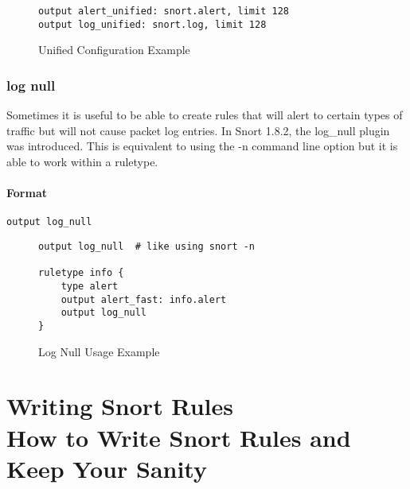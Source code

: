 \documentclass[english]{report}
\begin{document}
\begin{figure}[!hbpt]
\begin{verbatim}
output alert_unified: snort.alert, limit 128
output log_unified: snort.log, limit 128
\end{verbatim}
\caption{Unified Configuration Example\label{unified example}}
\end{figure}

\subsection{log null}

Sometimes it is useful to be able to create rules that will alert
to certain types of traffic but will not cause packet log entries.
In Snort 1.8.2, the log\_null plugin was introduced. This is equivalent
to using the -n command line option but it is able to work within
a ruletype.


\subsubsection{Format}

\begin{verbatim}
output log_null
\end{verbatim}
%
\begin{figure}[!hbpt]
\begin{verbatim}
output log_null  # like using snort -n

ruletype info {
    type alert
    output alert_fast: info.alert
    output log_null
}
\end{verbatim}
\caption{Log Null Usage Example\label{log null usage example}}
\end{figure}


\clearpage
\chapter{Writing Snort Rules\protect \\
How to Write Snort Rules and Keep Your Sanity\label{Writing Snort Rules}}
\end{document}
